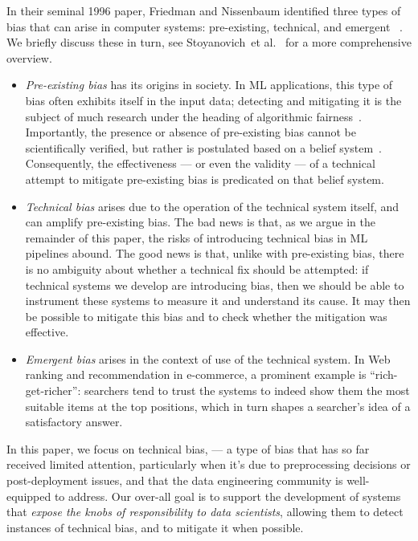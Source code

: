 \documentclass[11pt]{article}
\newcommand{\etal}{et al.\xspace}
\begin{document}
In their seminal 1996 paper, Friedman and Nissenbaum identified three types of bias that can arise in computer systems: pre-existing, technical, and emergent ~\cite{DBLP:journals/tois/FriedmanN96}.    We briefly discuss these in turn, see Stoyanovich~\etal~\cite{DBLP:journals/pvldb/StoyanovichHJ20} for a more comprehensive  overview.

\begin{itemize}[leftmargin=*]
\item \emph{Pre-existing  bias} has its origins in society.  In ML applications, this type of bias often exhibits itself in the input data; detecting and mitigating it is the subject of much research under the heading of algorithmic fairness~\cite{DBLP:journals/cacm/ChouldechovaR20}. Importantly, the presence or absence of pre-existing bias cannot be scientifically verified, but rather is postulated based on a belief system~\cite{DBLP:journals/corr/FriedlerSV16,DBLP:conf/fat/HeidariLGK19}. Consequently, the effectiveness --- or even the validity --- of a technical attempt to mitigate pre-existing bias is predicated on that belief system.

\item \emph{Technical bias} arises due to the operation of the technical system itself, and can amplify pre-existing bias.  The bad news is that, as we argue in the remainder of this paper, the risks of introducing technical bias in ML pipelines abound. The good news is that, unlike with pre-existing bias, there is no ambiguity about whether a technical fix should be attempted: if technical systems we develop are introducing bias, then we should be able to instrument these systems to measure it and understand its cause. It may then be possible to mitigate this bias and to check whether the mitigation was effective.

\item \emph{Emergent bias}   arises in the context of use of the technical system. In Web ranking and recommendation in e-commerce, a prominent example is ``rich-get-richer'': searchers tend to trust the systems to indeed show them the most suitable items at the top positions, which in turn shapes a searcher's idea of a satisfactory answer.

\end{itemize}

In this paper, we focus on technical bias,  --- a type of bias that has so far received limited attention, particularly when it's due to preprocessing decisions or post-deployment issues, and that the data engineering community is well-equipped to address.  Our over-all goal is to support the development of systems that \emph{expose the knobs of responsibility to data scientists}, allowing them to detect instances of technical bias, and to mitigate it when possible.
\end{document}
